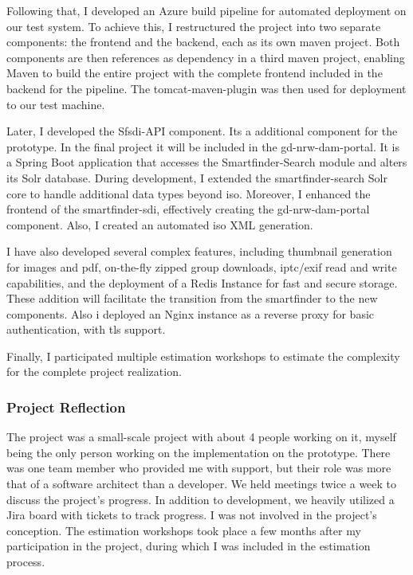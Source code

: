 \documentclass[11pt, titlepage, a4paper]{article}
\begin{document}
Following that, I developed an Azure build pipeline for automated deployment on our test system.  To achieve this, I restructured the project into two separate components: the frontend and the backend, each as its own maven project. %
Both components are then references as dependency in a third maven project, enabling Maven to build the entire project with the complete frontend included in the backend for the pipeline. The tomcat-maven-plugin was then used for deployment to our test machine.

Later, I developed the Sfsdi-API component. Its a additional component for the prototype. In the final project it will be included in the gd-nrw-dam-portal. It is a Spring Boot application that accesses the Smartfinder-Search module and alters its Solr database. During development, I extended the smartfinder-search Solr core to handle additional data types beyond \gls{iso}. Moreover, I enhanced the frontend of the smartfinder-sdi, effectively creating the gd-nrw-dam-portal component.
Also, I created an automated \gls{iso} XML generation.

I have also developed several complex features, including thumbnail generation for images and \gls{pdf}, on-the-fly zipped group downloads, \gls{iptc}/\gls{exif} read and write capabilities, and the deployment of a Redis Instance for fast and secure storage. These addition will facilitate the transition from the smartfinder to the new components. Also i deployed an Nginx instance as a reverse proxy for basic authentication, with \gls{tls} support.

Finally, I participated multiple estimation workshops to estimate the complexity for the complete project realization.

\subsubsection{Project Reflection}
The project was a small-scale project with about 4 people working on it, myself being the only person working on the implementation on the prototype. There was one team member who provided me with support, but their role was more that of a software architect than a developer.
We held meetings twice a week to discuss the project's progress. In addition to development, we heavily utilized a Jira board with tickets to track progress. I was not involved in the project's conception.
The estimation workshops took place a few months after my participation in the project, during which I was included in the estimation process.
\end{document}
